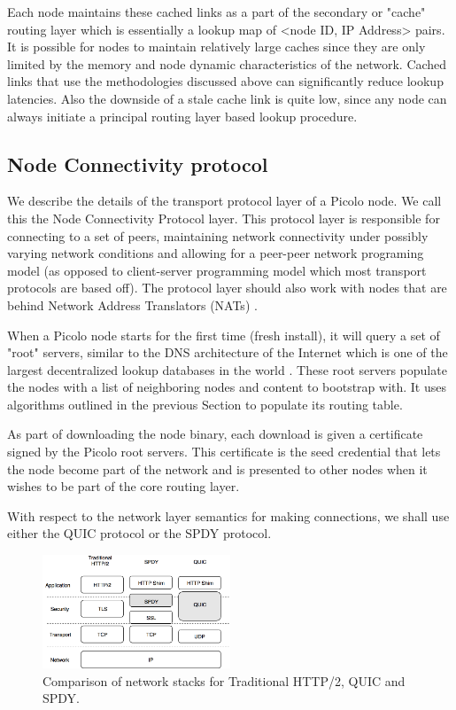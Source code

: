 Each node maintains these cached links as a part of the secondary or "cache" routing layer which is essentially a lookup
map of <node ID, IP Address> pairs. It is possible for nodes to maintain relatively large caches since they are only
limited by the memory and node dynamic characteristics of the network. Cached links that use the methodologies discussed
above can significantly reduce lookup latencies. Also the downside of a stale cache link is quite low, since any node
can always initiate a principal routing layer based lookup procedure.

\subsection{Node Connectivity protocol}
\label{net:net_proto}

We describe the details of the transport protocol layer of a Picolo node. We call this the Node Connectivity Protocol
layer. This protocol layer is responsible for connecting to a set of peers, maintaining network connectivity under
possibly varying network conditions and allowing for a peer-peer network programing model (as opposed to client-server
programming model which most transport protocols are based off).  The protocol layer should also work with nodes that
are behind Network Address Translators (NATs) \cite{nats}.

When a Picolo node starts for the first time (fresh install), it will query a set of "root" servers, similar to the DNS
architecture of the Internet which is one of the largest decentralized lookup databases in the world \cite{icann_root}. 
These root servers populate the nodes with a list of neighboring nodes and content to bootstrap with. It uses algorithms
outlined in the previous Section to populate its routing table.

As part of downloading the node binary, each download is given a certificate signed by the Picolo root servers. This
certificate is the seed credential that lets the node become part of the network and is presented to other nodes when it
wishes to be part of the core routing layer.

With respect to the network layer semantics for making connections, we shall use either the QUIC protocol or the SPDY
protocol.
\begin{figure}[h]
    \centering
    \includegraphics[width=0.5\textwidth]{fig/pic_netlayer.png}
  \caption{Comparison of network stacks for Traditional HTTP/2, QUIC and SPDY.}
\end{figure}


